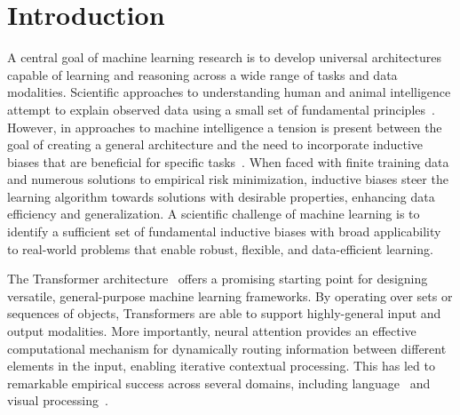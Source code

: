 \section{Introduction}\label{sec:intro}

A central goal of machine learning research is to develop universal architectures capable of learning and reasoning across a wide range of tasks and data modalities. Scientific approaches to understanding human and animal intelligence attempt to explain observed data using a small set of fundamental principles~\citep{marcus2003algebraic}. However, in approaches to machine intelligence a tension is present between the goal of creating a general architecture and the need to incorporate inductive biases that are beneficial for specific tasks~\citep{wolpert1995no,baxter2000model}. When faced with finite training data and numerous solutions to empirical risk minimization, inductive biases steer the learning algorithm towards solutions with desirable properties, enhancing data efficiency and generalization.
A scientific challenge of machine learning is to identify a sufficient set of fundamental inductive biases with broad applicability to real-world problems that enable robust, flexible, and data-efficient learning.

The Transformer architecture~\citep{vaswani2017attention} offers a promising starting point for designing versatile, general-purpose machine learning frameworks. By operating over sets or sequences of objects, Transformers are able to support highly-general input and output modalities. More importantly, neural attention provides an effective computational mechanism for dynamically routing information between different elements in the input, enabling iterative contextual processing. This has led to remarkable empirical success across several domains, including language~\citep{radfordImprovingLanguageUnderstanding2018,devlinBERTPretrainingDeep2019,radford2019language,kaplan2020scalinglawsneurallanguage,brown2020languagemodelsfewshotlearners} and visual processing~\citep{dosovitskiyImageWorth16x162020,carion2020end,zhai2022scaling}.


